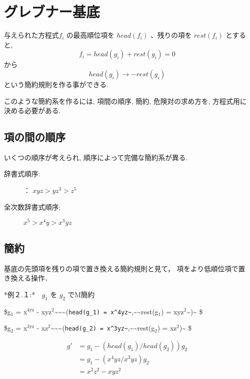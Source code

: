 \documentclass[a4j,12pt]{jarticle}
\begin{document}
\section{グレブナー基底}
\label{sec:org7819f1b}

与えられた方程式\(f_i\) の最高順位項を \(head(f_i)\) 、残りの項を
\(rest(f_i)\) とすると, $$f_i = head(g_i) + rest(g_i)  = 0$$ から
$$head(g_i) \rightarrow - rest(g_i)$$ という簡約規則を作る事ができる.

このような簡約系を作るには, 項間の順序, 簡約, 危険対の求め方を,
方程式用に決める必要がある.

\subsection{項の間の順序}
\label{sec:org7f8b232}

いくつの順序が考えられ, 順序によって完備な簡約系が異る.

\begin{description}
\item[{辞書式順序:}] ： \(xyz > yz^3 > z^5\)

\item[{全次数辞書式順序:}] \(x^5 > x^4y > x^3yz\)
\end{description}

\subsection{簡約}
\label{sec:org981413d}

基底の先頭項を残りの項で置き換える簡約規則と見て，
項をより低順位項で置き換える操作．

*例２.１:*　\(g_1\) を \(g_2\) でM簡約

\$g\(_{\text{1}}\) = x\(^{\text{4yz}}\) - xyz\(^{\text{2}}\)\textasciitilde{}\textasciitilde{}\textasciitilde{}(\texttt{head(g\_1) = x\textasciicircum{}4yz\textasciitilde{}},\textasciitilde{}\textasciitilde{}rest(g\(_{\text{1}}\)) = xyz\(^{\text{2}}\)\textasciitilde{})\textasciitilde{} \$

\$g\(_{\text{2}}\) = x\(^{\text{3yz}}\) - xz\(^{\text{2}}\)\textasciitilde{}\textasciitilde{}\textasciitilde{}(\texttt{head(g\_2) = x\textasciicircum{}3yz\textasciitilde{}},\textasciitilde{}\textasciitilde{}rest(g\(_{\text{2}}\)) = xz\(^{\text{2}}\))\textasciitilde{} \$

$$\begin{array}{ll}
g' & = g_1 - ( head(g_1) / head(g_2) ) g_2 \\
   & = g_1 - ( x^4yz / x^3yz ) g_2 \\
   & = x^2z^2 - xyz^2
\end{array}$$
\end{document}
